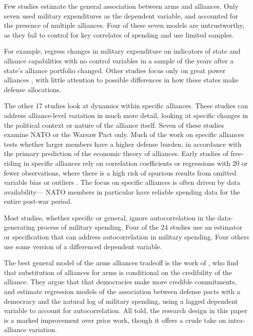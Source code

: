 \documentclass[12pt]{article}
\begin{document}
Few studies estimate the general association between arms and alliances. Only seven used military expenditures as the dependent variable, and accounted for the presence of multiple alliances. Four of these seven models are untrustworthy, as they fail to control for key correlates of spending and use limited samples. 

For example, \citet{MorganPalmer2003} regress changes in military expenditure on indicators of state and alliance capabilities with no control variables in a sample of the years after a state's alliance portfolio changed. Other studies focus only on great power alliances \citep{ConybeareSandler1990, Conybeare1994, Diehl1994, MostSiverson1987}, with little attention to possible differences in how these states make defense allocations. 

The other 17 studies look at dynamics within specific alliances. These studies can address alliance-level variation in much more detail, looking at specific changes in the political context or nature of the alliance itself. Seven of these studies examine NATO or the Warsaw Pact only. Much of the work on specific alliances tests whether larger members have a higher defense burden, in accordance with the primary prediction of the economic theory of alliances. Early studies of free-riding in specific alliances rely on correlation coefficients or regressions with 20 or fewer observations, where there is a high risk of spurious results from omitted variable bias or outliers \citep{OlsonZeckhauser1966, Starr1974, Reisinger1983, Siroky2012}. The focus on specific alliances is often driven by data availability--- NATO members in particular have reliable spending data for the entire post-war period. 

Most studies, whether specific or general, ignore autocorrelation in the data-generating process of military spending. Four of the 24 studies use an estimator or specification that can address autocorrelation in military spending. Four others use some version of a differenced dependent variable. 

The best general model of the arms alliances tradeoff is the work of \citet{DigiuseppePoast2016}, who find that substitution of alliances for arms is conditional on the credibility of the alliance. They argue that that democracies make more credible commitments, and estimate regression models of the association between defense pacts with a democracy and the natural log of military spending, using a lagged dependent variable to account for autocorrelation. All told, the research design in this paper is a marked improvement over prior work, though it offers a crude take on intra-alliance variation.  
\end{document}
